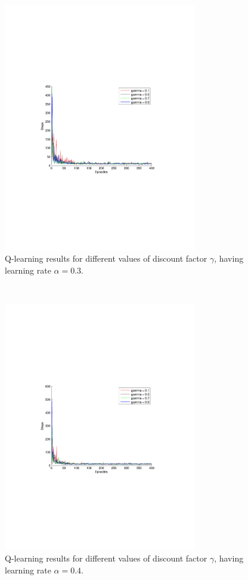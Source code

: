 \documentclass[a4paper,11pt]{article}
\begin{document}
\begin{figure}[h!]
  \centering
    \includegraphics[trim=4cm 8.5cm 4cm 8.5cm,clip,width=0.75\textwidth]{figures/qla03.pdf}
    \caption{Q-learning results for different values of discount factor $\gamma$, having learning rate $\alpha = 0.3$.}
\end{figure}
~
\begin{figure}[h!]
  \centering
    \includegraphics[trim=4cm 8.5cm 4cm 8.5cm,clip,width=0.75\textwidth]{figures/qla04.pdf}
    \caption{Q-learning results for different values of discount factor $\gamma$, having learning rate $\alpha = 0.4$.}
\end{figure}
\end{document}

